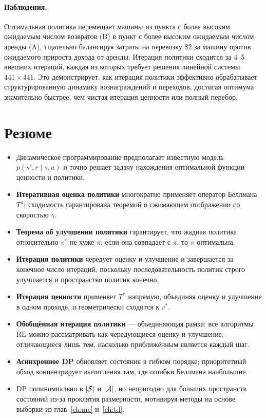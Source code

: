 \paragraph{Наблюдения.}
Оптимальная политика перемещает машины из пункта с более высоким ожидаемым числом возвратов (B) в пункт с более высоким ожидаемым числом аренды (A), тщательно балансируя затраты на перевозку \$2 за машину против ожидаемого прироста дохода от аренды.  Итерация политики сходится за 4--5 внешних итераций, каждая из которых требует решения линейной системы $441 \times 441$.  Это демонстрирует, как итерация политики эффективно обрабатывает структурированную динамику вознаграждений и переходов, достигая оптимума значительно быстрее, чем чистая итерация ценности или полный перебор.

\section{Резюме}
\label{sec:dp-summary}

\begin{itemize}[leftmargin=*]
\item Динамическое программирование предполагает известную модель $p(s',r \mid s,a)$ и точно решает задачу нахождения оптимальной функции ценности и политики.
\item \textbf{Итеративная оценка политики} многократно применяет оператор Беллмана $T^\pi$; сходимость гарантирована теоремой о сжимающем отображении со скоростью $\gamma$.
\item \textbf{Теорема об улучшении политики} гарантирует, что жадная политика относительно $v^\pi$ не хуже $\pi$; если она совпадает с $\pi$, то $\pi$ оптимальна.
\item \textbf{Итерация политики} чередует оценку и улучшение и завершается за конечное число итераций, поскольку последовательность политик строго улучшается и пространство политик конечно.
\item \textbf{Итерация ценности} применяет $T^*$ напрямую, объединяя оценку и улучшение в одном проходе, и геометрически сходится к $v^*$.
\item \textbf{Обобщённая итерация политики} — объединяющая рамка: все алгоритмы RL можно рассматривать как чередующиеся оценку и улучшение, отличающиеся лишь тем, насколько приближённым является каждый шаг.
\item \textbf{Асинхронное DP} обновляет состояния в гибком порядке; приоритетный обход концентрирует вычисления там, где ошибки Беллмана наибольшие.
\item DP полиномиально в $|\mathcal{S}|$ и $|\mathcal{A}|$, но непригодно для больших пространств состояний из-за проклятия размерности, мотивируя методы на основе выборки из глав~\ref{ch:mc} и~\ref{ch:td}.
\end{itemize}

